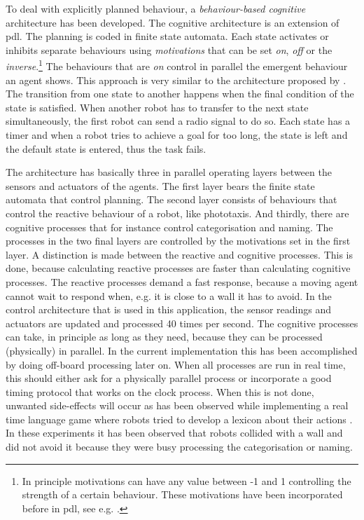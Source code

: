 To deal with explicitly planned behaviour, a {\em behaviour-based cognitive} architecture has been developed. The cognitive architecture is an extension of {\sc pdl}. The planning is coded in finite state automata. Each state activates or inhibits separate behaviours using {\em motivations} that can be set {\em on}, {\em off} or the {\em inverse}.\footnote{In principle motivations can have any value between -1 and 1 controlling the strength of a certain behaviour. These motivations have been incorporated before in {\sc pdl}, see e.g. \citealt{steels:1994,steels:1996c}.} The behaviours that are {\em on} control in parallel the emergent behaviour an agent shows. This approach is very similar to the architecture proposed by \citet{barnesetal:1997}. The transition from one state to another happens when the final condition of the state is satisfied. When another robot has to transfer to the next state simultaneously, the first robot can send a radio signal to do so. Each state has a timer and when a robot tries to achieve a goal for too long, the state is left and the default state is entered, thus the task fails.

The architecture has basically three in parallel operating layers between the sensors and actuators of the agents. The first layer bears the finite state automata that control planning. The second layer consists of behaviours that control the reactive behaviour of a robot, like phototaxis. And thirdly, there are cognitive processes that for instance control categorisation and naming. The processes in the two final layers are controlled by the motivations set in the first layer. A distinction is made between the reactive and cognitive processes. This is done, because calculating reactive processes are faster than calculating cognitive processes. The reactive processes demand a fast response, because a moving agent cannot wait to respond when, e.g. it is close to a wall it has to avoid. In the control architecture that is used in this application, the sensor readings and actuators are updated and processed 40 times per second. The cognitive processes can take, in principle as long as they need, because they can be processed (physically) in parallel. In the current implementation this has been accomplished by doing off-board processing later on. When all processes are run in real time, this should either ask for a physically parallel process or incorporate a good timing protocol that works on the clock process. When this is not done, unwanted side-effects will occur as has been observed while implementing a real time language game where robots tried to develop a lexicon about their actions \citep{vogt:1999a,vogt:2000}. In these experiments it has been observed that robots collided with a wall and did not avoid it because they were busy processing the categorisation or naming.

